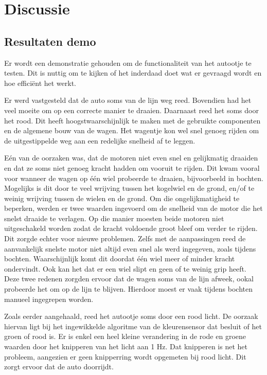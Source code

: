 \documentclass[a4paper,twoside,kulak]{kulakreport} %
\begin{document}
\section{Discussie} %
\subsection{Resultaten demo}  %
Er wordt een demonstratie gehouden om de functionaliteit van het autootje te testen. Dit is nuttig om te kijken of het inderdaad doet wat er gevraagd wordt en hoe efficiënt het werkt.

Er werd vastgesteld dat de auto soms van de lijn weg reed. Bovendien had het veel moeite om op een correcte manier te draaien. Daarnaast reed het soms door het rood. Dit heeft hoogstwaarschijnlijk te maken met de gebruikte componenten en de algemene bouw van de wagen. Het wagentje kon wel snel genoeg rijden om de uitgestippelde weg aan een redelijke snelheid af te leggen.

Eén van de oorzaken was, dat de motoren niet even snel en gelijkmatig draaiden en dat ze soms niet genoeg kracht hadden om vooruit te rijden. Dit kwam vooral voor wanneer de wagen op één wiel probeerde te draaien, bijvoorbeeld in bochten. Mogelijks is dit door te veel wrijving tussen het kogelwiel en de grond, en/of te weinig wrijving tussen de wielen en de grond. Om die ongelijkmatigheid te beperken, werden er twee waarden ingevoerd om de snelheid van de motor die het snelst draaide te verlagen. Op die manier moesten beide motoren niet uitgeschakeld worden zodat de kracht voldoende groot bleef om verder te rijden. Dit zorgde echter voor nieuwe problemen. Zelfs met de aanpassingen reed de aanvankelijk snelste motor niet altijd even snel als werd ingegeven, zoals tijdens bochten. Waarschijnlijk komt dit doordat één wiel meer of minder kracht ondervindt. Ook kan het dat er een wiel slipt en geen of te weinig grip heeft. Deze twee redenen zorgden ervoor dat de wagen soms van de lijn afweek, ookal probeerde het om op de lijn te blijven. Hierdoor moest er vaak tijdens bochten manueel ingegrepen worden.

Zoals eerder aangehaald, reed het autootje soms door een rood licht. De oorzaak hiervan ligt bij het ingewikkelde algoritme van de kleurensensor dat besluit of het groen of rood is. Er is enkel een heel kleine verandering in de rode en groene waarden door het knipperen van het licht aan 1 Hz. Dat knipperen is net het probleem, aangezien er geen knipperring wordt opgemeten bij rood licht. Dit zorgt ervoor dat de auto doorrijdt.
\end{document}

